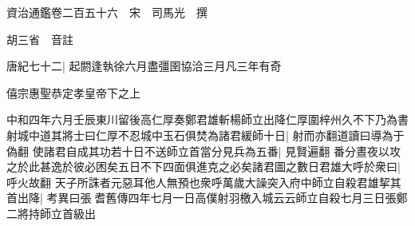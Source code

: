 






























































資治通鑑卷二百五十六　宋　司馬光　撰

胡三省　音註

唐紀七十二|{
	起閼逢執徐六月盡彊圉協洽三月凡三年有奇}


僖宗惠聖恭定孝皇帝下之上

中和四年六月壬辰東川留後高仁厚奏鄭君雄斬楊師立出降仁厚圍梓州久不下乃為書射城中道其將士曰仁厚不忍城中玉石俱焚為諸君緩師十日|{
	射而亦翻道讀曰導為于偽翻}
使諸君自成其功若十日不送師立首當分見兵為五番|{
	見賢遍翻}
番分晝夜以攻之於此甚逸於彼必困矣五日不下四面俱進克之必矣諸君圖之數日君雄大呼於衆曰|{
	呼火故翻}
天子所誅者元惡耳他人無預也衆呼萬歲大譟突入府中師立自殺君雄挈其首出降|{
	考異曰張耆舊傳四年七月一日高僕射羽檄入城云云師立自殺七月三日張鄭二將持師立首級出}


